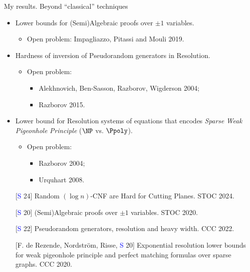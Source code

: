 \begin{frame}{My results. Beyond ``classical'' techniques}
        
    \begin{itemize}
        \item Lower bounds for (Semi)Algebraic proofs over $\pm 1$ variables.
            \begin{itemize}
                \item Open problem: Impagliazzo, Pitassi and Mouli 2019.
            \end{itemize}
        \pause
        \item Hardness of inversion of Pseudorandom generators in Resolution.
            \begin{itemize}
                \item Open problem:
                    \begin{itemize}
                        \item Alekhnovich, Ben-Sasson, Razborov, Wigderson 2004;
                        \item Razborov 2015.
                    \end{itemize}
            \end{itemize}
        \pause
        \item Lower bound for Resolution systems of equations that encodes \textit{Sparse Weak Pigeonhole
            Principle} (\alert{$\NP$ vs. $\Ppoly$}).
            \begin{itemize}
                \item Open problem:
                    \begin{itemize}
                        \item Razborov 2004;
                        \item Urquhart 2008.
                    \end{itemize}
            \end{itemize}
    \end{itemize}

    \begin{enumerate}
        \item[] [\textcolor{blue}{S} 24] Random $(\log n)$-CNF are Hard for Cutting Planes. STOC 2024.
        \item[] [\textcolor{blue}{S} 20] (Semi)Algebraic proofs over $\pm 1$ variables. STOC 2020.
        \item[] [\textcolor{blue}{S} 22] Pseudorandom generators, resolution and
            heavy width. CCC 2022.
        \item[] [F. de Rezende, Nordstr{\"{o}}m, Risse, \textcolor{blue}{S} 20] Exponential resolution lower
            bounds for weak pigeonhole principle and perfect matching formulas over sparse graphs. CCC
            2020.
    \end{enumerate}
\end{frame}

